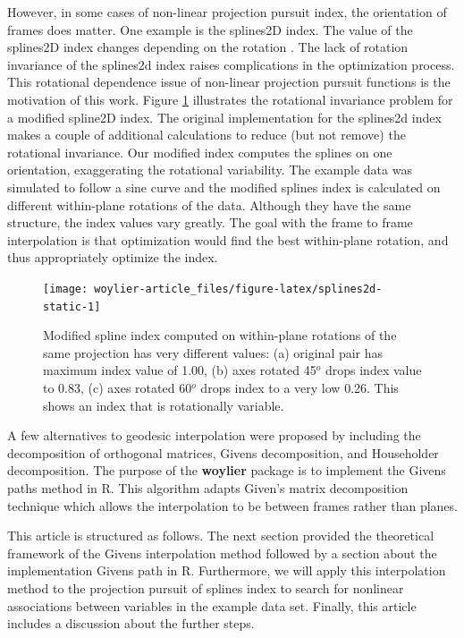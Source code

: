 However, in some cases of non-linear projection pursuit index, the
orientation of frames does matter. One example is the splines2D index.
The value of the splines2D index \citep{Grimm2016} changes depending on
the rotation \citep{pp}. The lack of rotation invariance of the
splines2d index raises complications in the optimization process. This
rotational dependence issue of non-linear projection pursuit functions
is the motivation of this work. Figure \ref{fig:splines2d-static}
illustrates the rotational invariance problem for a modified spline2D
index. The original implementation for the splines2d index makes a
couple of additional calculations to reduce (but not remove) the
rotational invariance. Our modified index computes the splines on one
orientation, exaggerating the rotational variability. The example data
was simulated to follow a sine curve and the modified splines index is
calculated on different within-plane rotations of the data. Although
they have the same structure, the index values vary greatly. The goal
with the frame to frame interpolation is that optimization would find
the best within-plane rotation, and thus appropriately optimize the
index.

\begin{Schunk}
\begin{figure}
\texttt{[image: woylier-article\_files/figure-latex/splines2d-static-1]} \caption[Modified spline index computed on within-plane rotations of the same projection has very different values]{Modified spline index computed on within-plane rotations of the same projection has very different values: (a) original pair has maximum index value of 1.00, (b) axes rotated 45$^o$ drops index value to 0.83, (c) axes rotated 60$^o$ drops index to a very low 0.26. This shows an index that is rotationally variable.}\label{fig:splines2d-static}
\end{figure}
\end{Schunk}

A few alternatives to geodesic interpolation were proposed by
\citet{buja_cook_asimov_hurley_2005} including the decomposition of
orthogonal matrices, Givens decomposition, and Householder
decomposition. The purpose of the \textbf{woylier} package is to
implement the Givens paths method in R. This algorithm adapts Given's
matrix decomposition technique which allows the interpolation to be
between frames rather than planes.

This article is structured as follows. The next section provided the
theoretical framework of the Givens interpolation method followed by a
section about the implementation Givens path in R. Furthermore, we will
apply this interpolation method to the projection pursuit of splines
index to search for nonlinear associations between variables in the
example data set. Finally, this article includes a discussion about the
further steps.

